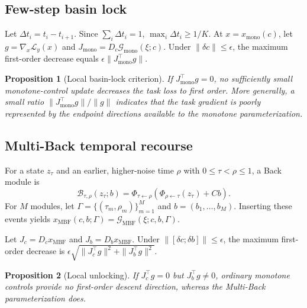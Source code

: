\documentclass[10pt,twocolumn]{article}
\newtheorem{proposition}{Proposition}
\begin{document}
\subsection{Few-step basin lock}
Let $\Delta t_i=t_i-t_{i+1}$. Since $\sum_i\Delta t_i=1$, $\max_i\Delta t_i\ge1/K$. At $x=x_{\mathrm{mono}}(c)$, let $g=\nabla_x\mathcal L_y(x)$ and $J_{\mathrm{mono}}=D_c\mathcal G_{\mathrm{mono}}(\xi;c)$. Under $\|\delta c\|\le\epsilon$, the maximum first-order decrease equals $\epsilon\|J_{\mathrm{mono}}^\top g\|$.

\begin{proposition}[Local basin-lock criterion]
If $J_{\mathrm{mono}}^\top g=0$, no sufficiently small monotone-control update decreases the task loss to first order. More generally, a small ratio $\|J_{\mathrm{mono}}^\top g\|/\|g\|$ indicates that the task gradient is poorly represented by the endpoint directions available to the monotone parameterization.
\end{proposition}

\subsection{Multi-Back temporal recourse}
For a state $z_\tau$ and an earlier, higher-noise time $\rho$ with $0\le\tau<\rho\le1$, a Back module is
\begin{equation}
\mathcal B_{\tau,\rho}(z_\tau;b)=\Phi_{\tau\leftarrow\rho}\!\left(\Phi_{\rho\leftarrow\tau}(z_\tau)+C b\right).
\end{equation}
For $M$ modules, let $\Gamma=\{(\tau_m,\rho_m)\}_{m=1}^M$ and $b=(b_1,\ldots,b_M)$. Inserting these events yields $x_{\mathrm{MBF}}(c,b;\Gamma)=\mathcal G_{\mathrm{MBF}}(\xi;c,b,\Gamma)$.

Let $J_c=D_cx_{\mathrm{MBF}}$ and $J_b=D_bx_{\mathrm{MBF}}$. Under $\|[\delta c;\delta b]\|\le\epsilon$, the maximum first-order decrease is $\epsilon\sqrt{\|J_c^\top g\|^2+\|J_b^\top g\|^2}$.

\begin{proposition}[Local unlocking]
If $J_c^\top g=0$ but $J_b^\top g\ne0$, ordinary monotone controls provide no first-order descent direction, whereas the Multi-Back parameterization does.
\end{proposition}
\end{document}
